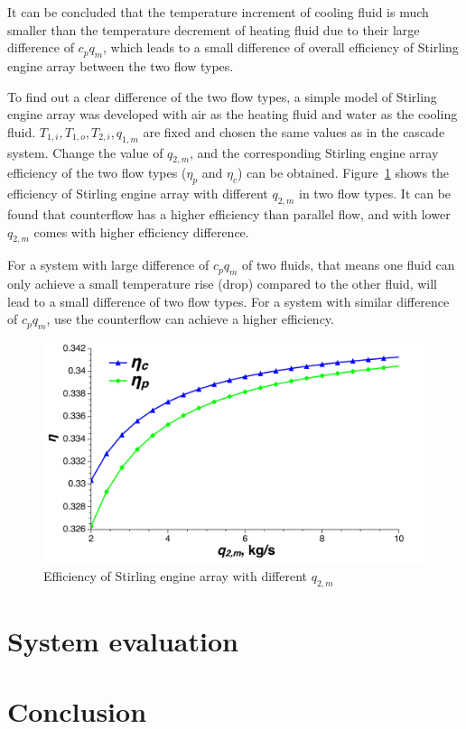 It can be concluded that the temperature increment of cooling fluid is much smaller than the temperature decrement of heating fluid due to their large difference of $c_pq_m$, which leads to a small difference of overall efficiency of Stirling engine array between the two flow types.

To find out a clear difference of the two flow types, a simple model of Stirling engine array was developed with air as the heating fluid and water as the cooling fluid. $T_{1,i}, T_{1,o}, T_{2,i}, q_{1,m}$ are fixed and chosen the same values as in the cascade system. Change the value of $q_{2,m}$, and the corresponding Stirling engine array efficiency of the two flow types ($\eta_p$ and $\eta_c$) can be obtained. Figure~\ref{fig:SEAflowtypes} shows the efficiency of Stirling engine array with different $q_{2,m}$ in two flow types. It can be found that counterflow has a higher efficiency than parallel flow, and with lower $q_{2,m}$ comes with higher efficiency difference.

For a system with large difference of $c_pq_m$ of two fluids, that means one fluid can only achieve a small temperature rise (drop) compared to the other fluid, will lead to a small difference of two flow types. For a system with similar difference of $c_pq_m$, use the counterflow can achieve a higher efficiency.

\noindent \begin{figure}[H]
\begin{center}
	\includegraphics[width = 0.8\columnwidth, angle = 0]{fig/SEAflowtypes}
	\caption{Efficiency of Stirling engine array with different $q_{2,m}$}
	\label{fig:SEAflowtypes}
\end{center}
\end{figure}
\section{System evaluation}
\section{Conclusion}